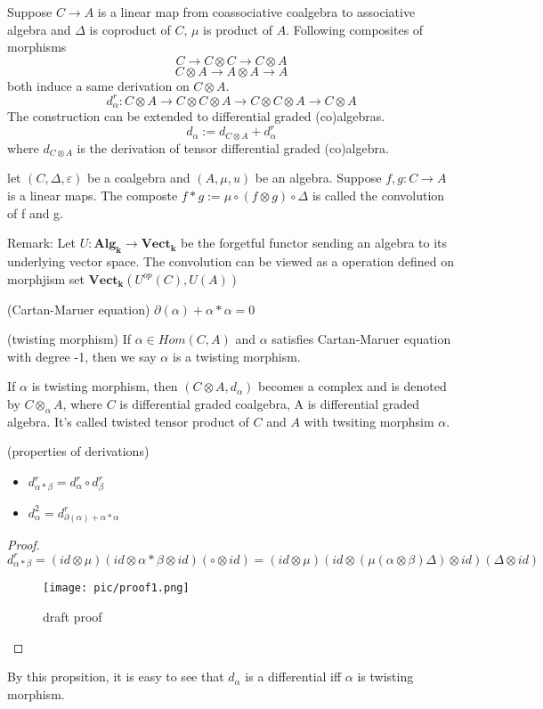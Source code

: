 Suppose $C \rightarrow A$ is a linear map from coassociative coalgebra to associative algebra and $\Delta$ is coproduct of $C$, $\mu$ is product of $A$. Following composites of morphisms 
\[
C \rightarrow C \otimes C \rightarrow C \otimes A
\]
\[
C \otimes A \rightarrow A \otimes A \rightarrow A
\]
both induce a same derivation on $C \otimes A$.
\[
d^{r}_{\alpha}: C \otimes A \rightarrow C \otimes C \otimes A \rightarrow C \otimes C \otimes A \rightarrow C \otimes A
\]
The construction can be extended to differential graded (co)algebras.
\[
d_{\alpha}:= d_{C\otimes A}+d_{\alpha}^{r}
\]
where $d_{C\otimes A}$ is the derivation of tensor differential graded (co)algebra.
\begin{mydefn}
let $(C, \Delta, \varepsilon)$ be a coalgebra and $(A, \mu, u)$ be an algebra. Suppose $f,g: C \rightarrow A$ is a linear maps. The composte $f * g := \mu \circ (f \otimes g) \circ 
\Delta$ is called the convolution of f and g.
\end{mydefn}
Remark: Let $U: \mathbf{Alg_{k}} \rightarrow \mathbf{Vect_{k}}$ be the forgetful functor sending an algebra to its underlying vector space. The convolution can be viewed as a operation defined on  morphjism set  $\mathbf{Vect_{k}}(U^{op}(C), U(A))$
\begin{mydefn}
(Cartan-Maruer equation) $\partial(\alpha)+ \alpha * \alpha = 0$
\end{mydefn}
\begin{mydefn}
(twisting morphism) If $\alpha \in Hom(C,A)$ and $\alpha$ satisfies Cartan-Maruer equation with degree -1, then we say $\alpha$ is a twisting morphism.
\end{mydefn}
\begin{mydefn}
If $\alpha$ is twisting morphism, then $(C \otimes A , d_{\alpha})$ becomes a complex and is denoted by $C\otimes_{\alpha} A$, where $C$ is differential graded coalgebra, A is differential graded algebra. It's called twisted tensor product of $C$ and $A$ with twsiting morphsim $ \alpha$.
\end{mydefn}
\begin{prop}
(properties of derivations)
\begin{itemize}
    \item $d_{\alpha * \beta}^{r} =d_{\alpha}^{r} \circ d_{\beta}^{r}$
    \item $d_{\alpha}^2=d_{\partial(\alpha)+\alpha * \alpha}^{r}$
\end{itemize}
\end{prop}
\begin{proof}
$d^{r}_{\alpha * \beta} = (id \otimes \mu)(id \otimes \alpha * \beta \otimes id)(\circ \otimes id )=(id \otimes \mu)(id \otimes (\mu(\alpha \otimes \beta) \Delta) \otimes id)(\Delta \otimes id)$
\begin{figure}[htbp]
    \centering
    \texttt{[image: pic/proof1.png]}
    \caption{draft proof}
    \label{fig:draft proof}
\end{figure}

\end{proof}
By this propsition, it is easy to see that $d_{\alpha}$ is a differential iff $\alpha$ is twisting morphism.